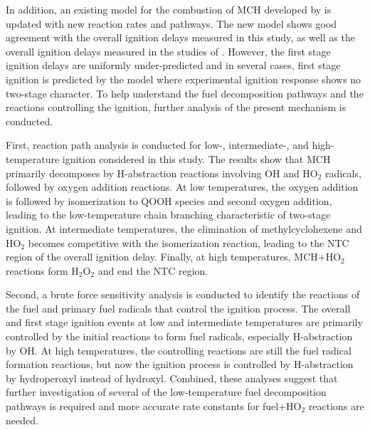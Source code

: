 \documentclass[12pt, letterpaper]{article}
\begin{document}
In addition, an existing model for the combustion of MCH developed by
\textcite{Pitz2007} is updated with new reaction rates and pathways.
The new model shows good agreement with the overall ignition delays
measured in this study, as well as the overall ignition delays measured
in the studies of \textcite{Mittal2009,Vasu2009,Vanderover2009}. However,
the first stage ignition delays are uniformly under-predicted and in
several cases, first stage ignition is predicted by the model where
experimental ignition response shows no two-stage character. To help
understand the fuel decomposition pathways and the reactions controlling
the ignition, further analysis of the present mechanism is conducted.

First, reaction path analysis is conducted for low-, intermediate-, and
high-temperature ignition considered in this study. The results show that
MCH primarily decomposes by H-abstraction reactions involving OH and HO$_2$
radicals, followed by oxygen addition reactions. At low temperatures,
the oxygen addition is followed by isomerization to QOOH species and
second oxygen addition, leading to the low-temperature chain branching
characteristic of two-stage ignition. At intermediate temperatures, the
elimination of methylcyclohexene and HO$_2$ becomes competitive with the
isomerization reaction, leading to the NTC region of the overall ignition
delay. Finally, at high temperatures, MCH+HO$_2$ reactions form H$_2$O$_2$ and end
the NTC region.

Second, a brute force sensitivity analysis is conducted to identify the
reactions of the fuel and primary fuel radicals that control the ignition
process. The overall and first stage ignition events at low and intermediate
temperatures are primarily controlled by the initial reactions to form
fuel radicals, especially H-abstraction by OH. At high temperatures, the
controlling reactions are still the fuel radical formation reactions, but
now the ignition process is controlled by H-abstraction by hydroperoxyl
instead of hydroxyl. Combined, these analyses suggest that further
investigation of several of the low-temperature fuel decomposition
pathways is required and more accurate rate constants for fuel+HO$_2$
reactions are needed.
\end{document}
